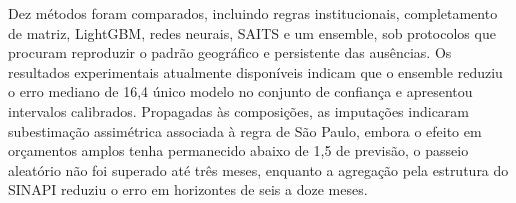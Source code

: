 \begin{resumo}
Dez métodos foram comparados, incluindo regras institucionais, completamento de matriz, 
LightGBM, redes neurais, SAITS e um ensemble, sob protocolos que procuram reproduzir o 
padrão geográfico e persistente das ausências. Os resultados experimentais atualmente 
disponíveis indicam que o ensemble reduziu o erro mediano de 16,4%
único modelo no conjunto de confiança e apresentou intervalos calibrados. Propagadas às 
composições, as imputações indicaram subestimação assimétrica associada à regra de São 
Paulo, embora o efeito em orçamentos amplos tenha permanecido abaixo de 1,5%
de previsão, o passeio aleatório não foi superado até três meses, enquanto a agregação 
pela estrutura do SINAPI reduziu o erro em horizontes de seis a doze meses.
\end{resumo}
